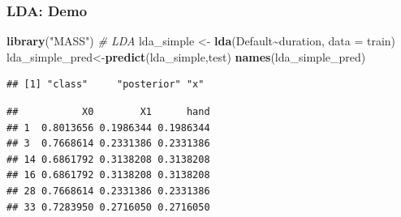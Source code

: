 \documentclass[
  shownotes,
  xcolor={svgnames},
  hyperref={colorlinks,citecolor=DarkBlue,linkcolor=DarkRed,urlcolor=DarkBlue}
  , aspectratio=169]{beamer}
\newenvironment{Shaded}{\begin{snugshade}}{\end{snugshade}}
\newcommand{\CommentTok}[1]{\textcolor[rgb]{0.56,0.35,0.01}{\textit{#1}}}
\newcommand{\DataTypeTok}[1]{\textcolor[rgb]{0.13,0.29,0.53}{#1}}
\newcommand{\DecValTok}[1]{\textcolor[rgb]{0.00,0.00,0.81}{#1}}
\newcommand{\KeywordTok}[1]{\textcolor[rgb]{0.13,0.29,0.53}{\textbf{#1}}}
\newcommand{\NormalTok}[1]{#1}
\newcommand{\OperatorTok}[1]{\textcolor[rgb]{0.81,0.36,0.00}{\textbf{#1}}}
\newcommand{\StringTok}[1]{\textcolor[rgb]{0.31,0.60,0.02}{#1}}
\begin{document}
\begin{frame}[fragile]
\frametitle{LDA: Demo}
\begin{scriptsize}


\begin{Shaded}
\begin{Highlighting}[]
\KeywordTok{library}\NormalTok{(}\StringTok{"MASS"}\NormalTok{)     }\CommentTok{\# LDA}
\NormalTok{lda\_simple \textless{}{-}}\StringTok{ }\KeywordTok{lda}\NormalTok{(Default}\OperatorTok{\textasciitilde{}}\NormalTok{duration, }\DataTypeTok{data =}\NormalTok{ train)}
\NormalTok{lda\_simple\_pred\textless{}{-}}\KeywordTok{predict}\NormalTok{(lda\_simple,test)}
\KeywordTok{names}\NormalTok{(lda\_simple\_pred)}
\end{Highlighting}
\end{Shaded}
\end{scriptsize}
\begin{tiny}
\begin{verbatim}
## [1] "class"     "posterior" "x"
\end{verbatim}
\end{tiny}


\begin{scriptsize}
\begin{Shaded}
\end{Shaded}



\begin{verbatim}
##           X0        X1      hand
## 1  0.8013656 0.1986344 0.1986344
## 3  0.7668614 0.2331386 0.2331386
## 14 0.6861792 0.3138208 0.3138208
## 16 0.6861792 0.3138208 0.3138208
## 28 0.7668614 0.2331386 0.2331386
## 33 0.7283950 0.2716050 0.2716050
\end{verbatim}
\end{scriptsize}
\end{frame}

\end{document}
